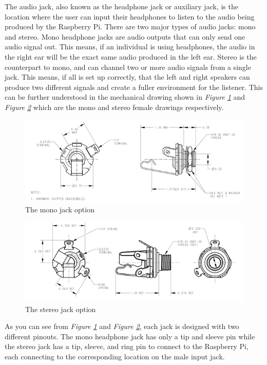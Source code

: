 The audio jack, also known as the headphone jack or auxiliary jack, is the location where the user can input their headphones to listen to the audio being produced by the Raspberry Pi. There are two major types of audio jacks: mono and stereo. Mono headphone jacks are audio outputs that can only send one audio signal out. This means, if an individual is using headphones, the audio in the right ear will be the exact same audio produced in the left ear. Stereo is the counterpart to mono, and can channel two or more audio signals from a single jack. This means, if all is set up correctly, that the left and right speakers can produce two different signals and create a fuller environment for the listener. This can be further understood in the mechanical drawing shown in \textit{Figure \ref{fig:mono}} and \textit{Figure \ref{fig:stereo}} which are the mono and stereo female drawings respectively.

\begin{figure}[h!]
  \centering
  \includegraphics[width=\linewidth]{image/Mono.png}
  \caption{The mono jack option}
  \label{fig:mono}
\end{figure}
\begin{figure}[h!]
  \centering
  \includegraphics[width=\linewidth]{image/Stereo.png}
  \caption{The stereo jack option}
  \label{fig:stereo}
\end{figure}

As you can see from \textit{Figure \ref{fig:mono}} and \textit{Figure \ref{fig:stereo}}, each jack is designed with two different pinouts. The mono headphone jack has only a tip and sleeve pin while the stereo jack has a tip, sleeve, and ring pin to connect to the Raspberry Pi,  each connecting to the corresponding location on the male input jack.

